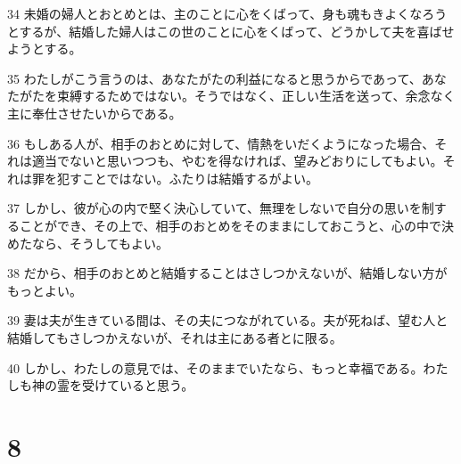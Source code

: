 \par 34 未婚の婦人とおとめとは、主のことに心をくばって、身も魂もきよくなろうとするが、結婚した婦人はこの世のことに心をくばって、どうかして夫を喜ばせようとする。
\par 35 わたしがこう言うのは、あなたがたの利益になると思うからであって、あなたがたを束縛するためではない。そうではなく、正しい生活を送って、余念なく主に奉仕させたいからである。
\par 36 もしある人が、相手のおとめに対して、情熱をいだくようになった場合、それは適当でないと思いつつも、やむを得なければ、望みどおりにしてもよい。それは罪を犯すことではない。ふたりは結婚するがよい。
\par 37 しかし、彼が心の内で堅く決心していて、無理をしないで自分の思いを制することができ、その上で、相手のおとめをそのままにしておこうと、心の中で決めたなら、そうしてもよい。
\par 38 だから、相手のおとめと結婚することはさしつかえないが、結婚しない方がもっとよい。
\par 39 妻は夫が生きている間は、その夫につながれている。夫が死ねば、望む人と結婚してもさしつかえないが、それは主にある者とに限る。
\par 40 しかし、わたしの意見では、そのままでいたなら、もっと幸福である。わたしも神の霊を受けていると思う。

\chapter{8}

